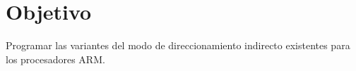 \section{Objetivo}
Programar las variantes del modo de direccionamiento indirecto existentes para los procesadores ARM.
